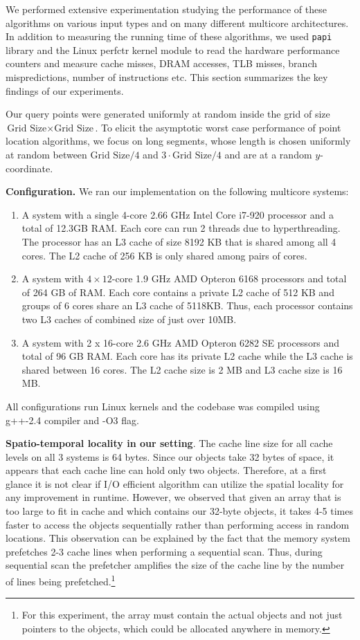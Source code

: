We performed extensive experimentation studying the performance of
these algorithms on various input types and on many different
multicore architectures. In addition to measuring the running time of
these algorithms, we used {\tt papi} library and the Linux perfctr kernel module to
read the hardware performance counters and measure cache misses, DRAM
accesses, TLB misses, branch mispredictions, number of instructions
etc. This section summarizes the key findings of
our experiments.

Our query points were generated uniformly at random inside the
grid of size $\mbox{Grid Size} \times \mbox{Grid Size}$. To elicit the
asymptotic worst case performance of point
location algorithms, we focus on long segments, whose length is chosen
uniformly at random between $\mbox{Grid Size/4}$ and $3\cdot\mbox{Grid
  Size}/4$ and are at a random $y$-coordinate.

\textbf{Configuration.} We ran our implementation on the following multicore systems:
\begin{enumerate}
\item
\label{item:intel}
A system with a single 4-core 2.66 GHz Intel Core i7-920 processor and a total
of 12.3GB RAM. Each core can run 2 threads due to hyperthreading. The
processor has an L3 cache of size 8192 KB that is shared
among all 4 cores. The L2 cache of 256 KB is only shared among pairs of cores.
\item
\label{item:amd}
A system with $4\times 12$-core 1.9 GHz AMD Opteron 6168 processors 
and total of 264 GB of RAM.  Each core contains a private L2 cache of 512
KB and groups of 6 cores share an L3 cache of 5118KB. Thus, each processor
contains two L3 caches of combined size of just over 10MB.
\item
\label{item:bli}
A system with 2 x 16-core 2.6 GHz AMD Opteron 6282 SE processors and
total of 96 GB RAM. Each core has its private L2 cache while the L3
cache is shared between 16 cores. The L2 cache size is 2 MB and L3 cache size is 16 MB. 
\end{enumerate}

All configurations run Linux kernels and the codebase was
compiled using g++-2.4 compiler and -O3 flag.

\textbf{Spatio-temporal locality in our setting}.
The cache line size for all cache levels on all 3 systems is 64 bytes. Since our objects take 32 bytes
of space, it appears that each cache line can hold only two objects.
Therefore, at a first glance it is not clear if I/O efficient
algorithm can utilize the spatial locality for any improvement in runtime. However, we
observed that given an array that is too large to fit in cache and which contains
our 32-byte objects, it takes 4-5 times faster to access the objects
sequentially rather than performing access in random locations. This
observation can be explained by the fact that the memory system prefetches 2-3
cache lines when performing a sequential scan. Thus, during sequential scan the
prefetcher amplifies the size of the cache line by the number of lines being
prefetched.\footnote{For this experiment, the array must contain the actual
objects and not just pointers to the objects, which could be allocated anywhere
in memory.}

